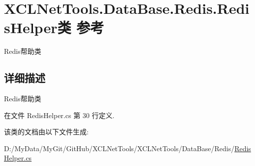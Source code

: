 \hypertarget{class_x_c_l_net_tools_1_1_data_base_1_1_redis_1_1_redis_helper}{\section{X\-C\-L\-Net\-Tools.\-Data\-Base.\-Redis.\-Redis\-Helper类 参考}
\label{class_x_c_l_net_tools_1_1_data_base_1_1_redis_1_1_redis_helper}
}


Redis帮助类  




\subsection{详细描述}
Redis帮助类 



在文件 Redis\-Helper.\-cs 第 30 行定义.



该类的文档由以下文件生成\-:\begin{DoxyCompactItemize}
\item 
D\-:/\-My\-Data/\-My\-Git/\-Git\-Hub/\-X\-C\-L\-Net\-Tools/\-X\-C\-L\-Net\-Tools/\-Data\-Base/\-Redis/\hyperlink{_redis_helper_8cs}{Redis\-Helper.\-cs}\end{DoxyCompactItemize}
